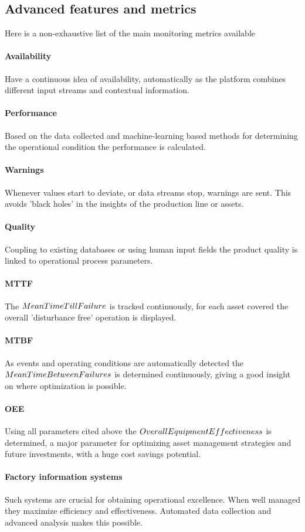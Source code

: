 \subsection{Advanced features and metrics}
Here is a non-exhaustive list of the main monitoring metrics available 
\paragraph{Availability}
Have a continuous idea of availability, automatically as the platform combines different input streams and contextual information.
\paragraph{Performance}
Based on the data collected and machine-learning based methods for determining the operational condition the performance is calculated.
\paragraph{Warnings}
Whenever values start to deviate, or data streams stop, warnings are sent. This avoids 'black holes' in the insights of the production line or assets.
\paragraph{Quality}
Coupling to existing databases or using human input fields the product quality is linked to operational process parameters.
\paragraph{MTTF}
The \(Mean\space Time\space Till\space Failure\) is tracked continuously, for each asset covered the overall 'disturbance free' operation is displayed.
\paragraph{MTBF}
As events and operating conditions are automatically detected the \(Mean \space Time \space Between \space Failures\) is determined continuously, giving a good insight on where optimization is possible.
\paragraph{OEE}
Using all parameters cited above the \(Overall\space Equipment\space Effectiveness\) is determined, a major parameter for optimizing asset management strategies and future investments, with a huge cost savings potential.
\paragraph{Factory information systems}
Such systems are crucial for obtaining operational excellence. When well managed they maximize efficiency and effectiveness. Automated data collection and advanced analysis makes this possible.
